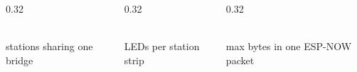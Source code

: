 \documentclass[aspectratio=169,t]{beamer}
\begin{document}
{\begin{frame}[plain]
\vspace{4mm}
\begin{columns}[t,totalwidth=\linewidth]
\begin{column}{0.32\textwidth}
\begin{darkcard}[height=1.9cm,valign=center]
\\[1.8mm]
{\color{creamMuted}\fontsize{8}{10}\selectfont stations sharing one bridge}
\end{darkcard}
\end{column}
\begin{column}{0.32\textwidth}
\begin{darkcard}[height=1.9cm,valign=center]
\\[1.8mm]
{\color{creamMuted}\fontsize{8}{10}\selectfont LEDs per station strip}
\end{darkcard}
\end{column}
\begin{column}{0.32\textwidth}
\begin{darkcard}[height=1.9cm,valign=center]
\\[1.8mm]
{\color{creamMuted}\fontsize{8}{10}\selectfont max bytes in one ESP-NOW packet}
\end{darkcard}
\end{column}
\end{columns}
\end{frame}
}
\end{document}
